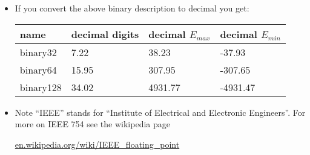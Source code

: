 \documentclass[11pt]{amsart}
\begin{document}
\begin{itemize}
\item If you convert the above binary description to decimal you get:

\begin{tabular}{llll}
name & decimal digits & decimal $E_{max}$ & decimal $E_{min}$ \\ \hline
binary32 &
7.22 &
38.23 &
-37.93 \\
%
binary64 &
15.95 &
307.95 &
-307.65 \\
%
binary128 &
34.02 &
4931.77 &
-4931.47
\end{tabular}

\item Note ``IEEE'' stands for ``Institute of Electrical and Electronic Engineers''.  For more on IEEE 754 see the wikipedia page

 \centerline{\url{en.wikipedia.org/wiki/IEEE_floating_point}}

\end{itemize}
\end{document}
